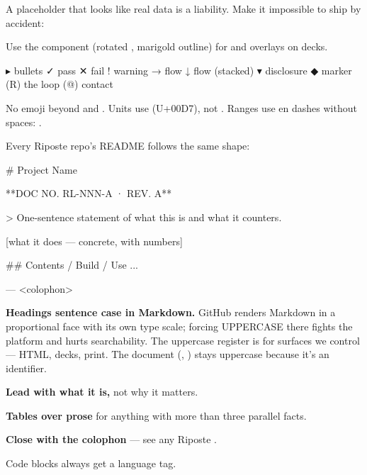 \documentclass[fontpath=fonts/,logopath=logo/]{riposte-doc}
\begin{document}

A placeholder that looks like real data is a liability. Make it impossible to ship by accident:

\ripcodeopen
{}
\ripcodesizereset\ripcodeclose

Use the  component (rotated , marigold outline) for  and  overlays on decks.



\ripcodeopen
{}
\begin{ripcodeblock}
▸  bullets       ✓  pass       ✕  fail       !  warning
→  flow          ↓  flow (stacked)           ▾  disclosure
◆  marker        (R)  the loop   (@)  contact
\end{ripcodeblock}
\ripcodesizereset\ripcodeclose

No emoji beyond \ripmono{\riploop{}} and \ripmono{\ripmail{}}. Units use  (U+00D7), not . Ranges use en dashes without spaces: .



Every Riposte repo's README follows the same shape:

\ripcodeopen
{}
\begin{ripcodeblock}
# Project Name

**DOC NO. RL-NNN-A · REV. A**

> One-sentence statement of what this is and what it counters.

[what it does — concrete, with numbers]

## Contents / Build / Use
...

---
<colophon>
\end{ripcodeblock}
\ripcodesizereset\ripcodeclose

\begin{ripbullets}
\item \textbf{Headings sentence case in Markdown.} GitHub renders Markdown in a proportional face with its own type scale; forcing UPPERCASE there fights the platform and hurts searchability. The uppercase register is for surfaces we control — HTML, decks, print. The document  (, ) stays uppercase because it's an identifier.
\item \textbf{Lead with what it is,} not why it matters.
\item \textbf{Tables over prose} for anything with more than three parallel facts.
\item \textbf{Close with the colophon} — see any Riposte .
\item Code blocks always get a language tag.
\end{ripbullets}
\end{document}

